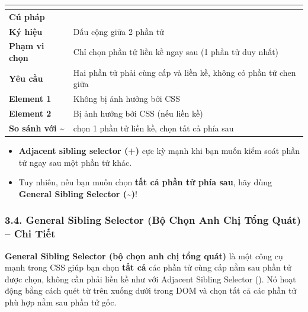 \begin{prettyTableBox}
\sffamily\small
\begin{tabularx}{\linewidth}{|>{\bfseries\color{primaryBlue}}K{3.5cm}|Z|}
\hline
{}  &  \\
\hline
Cú pháp &  \\
\hline
Ký hiệu & Dấu cộng \codeinline{+} giữa 2 phần tử \\
\hline
Phạm vi chọn & Chỉ chọn phần tử liền kề ngay sau (1 phần tử duy nhất) \\
\hline
Yêu cầu & Hai phần tử phải cùng cấp và liền kề, không có phần tử chen giữa \\
\hline
Element 1 & Không bị ảnh hưởng bởi CSS \\
\hline
Element 2 & Bị ảnh hưởng bởi CSS (nếu liền kề) \\
\hline
So sánh với \textasciitilde{} & \codeinline{+} chọn 1 phần tử liền kề, \codeinline{\textasciitilde{}} chọn tất cả phía sau \\
\hline
\end{tabularx}
\end{prettyTableBox}

\begin{tipBox}
\begin{itemize}[leftmargin=1.5em, itemsep=3pt, parsep=0pt]
    \item \textbf{Adjacent sibling selector (+)} cực kỳ mạnh khi bạn muốn kiểm soát phần tử ngay sau một phần tử khác.
    \item Tuy nhiên, nếu bạn muốn chọn \textbf{tất cả phần tử phía sau}, hãy dùng \textbf{General Sibling Selector (\textasciitilde{})}!
\end{itemize}
\end{tipBox}


\subsubsection{3.4. General Sibling Selector (Bộ Chọn Anh Chị Tổng Quát) -- Chi Tiết}

\begin{conceptBox}
\textbf{General Sibling Selector (bộ chọn anh chị tổng quát)} là một công cụ mạnh trong CSS giúp bạn chọn \textbf{tất cả} các phần tử cùng cấp nằm sau phần tử được chọn, không cần phải liền kề như với Adjacent Sibling Selector (\codeinline{+}). Nó hoạt động bằng cách quét từ trên xuống dưới trong DOM và chọn tất cả các phần tử phù hợp nằm sau phần tử gốc.
\end{conceptBox}


